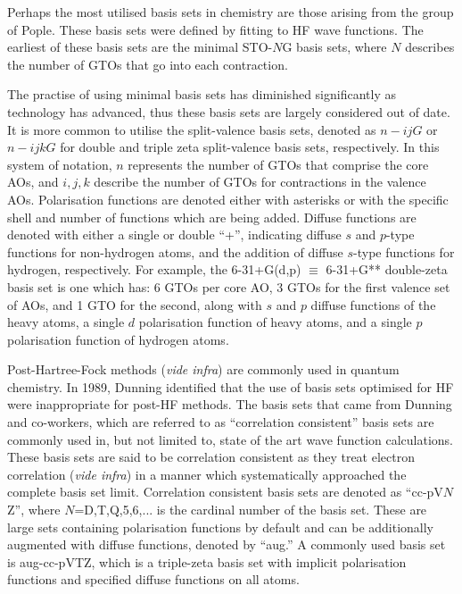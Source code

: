 \vspace{3mm}
\vspace{1mm}

Perhaps the most utilised basis sets in chemistry are those arising from the group of Pople.\cite{Hehre1969} These basis sets were defined by fitting to HF wave functions. The earliest of these basis sets are the minimal STO-$N$G basis sets, where $N$ describes the number of GTOs that go into each contraction.

The practise of using minimal basis sets has diminished significantly as technology has advanced, thus these basis sets are largely considered out of date. It is more common to utilise the split-valence basis sets, denoted as $n-ijG$ or $n-ijkG$ for double and triple zeta split-valence basis sets, respectively. In this system of notation, $n$ represents the number of GTOs that comprise the core AOs, and $i, j, k$ describe the number of GTOs for contractions in the valence AOs. Polarisation functions are denoted either with asterisks or with the specific shell and number of functions which are being added. Diffuse functions are denoted with either a single or double ``+'', indicating diffuse $s$ and $p$-type functions for non-hydrogen atoms, and the addition of diffuse $s$-type functions for hydrogen, respectively. For example, the 6-31+G(d,p) $\equiv$ 6-31+G** double-zeta basis set is one which has: 6 GTOs per core AO, 3 GTOs for the first valence set of AOs, and 1 GTO for the second, along with $s$ and $p$ diffuse functions of the heavy atoms, a single $d$ polarisation function of heavy atoms, and a single $p$ polarisation function of hydrogen atoms.

\vspace{3mm}
\vspace{1mm}

Post-Hartree-Fock methods (\emph{vide infra}) are commonly used in quantum chemistry. In 1989, Dunning\cite{Dunning1989} identified that the use of basis sets optimised for HF were inappropriate for post-HF methods. The basis sets that came from Dunning and co-workers, which are referred to as ``correlation consistent'' basis sets are commonly used in, but not limited to, state of the art wave function calculations. These basis sets are said to be correlation consistent as they treat electron correlation (\emph{vide infra}) in a manner which systematically approached the complete basis set limit. Correlation consistent basis sets are denoted as ``cc-pV$N$Z'', where $N$=D,T,Q,5,6,... is the cardinal number of the basis set. These are large sets containing polarisation functions by default and can be additionally augmented with diffuse functions, denoted by ``aug.'' A commonly used basis set is aug-cc-pVTZ, which is a triple-zeta basis set with implicit polarisation functions and specified diffuse functions on all atoms.

